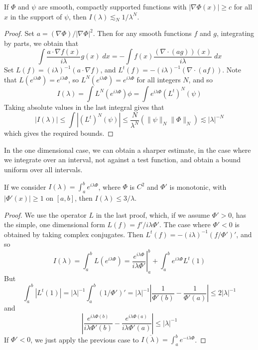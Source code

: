 \begin{theorem}
	If $\Phi$ and $\psi$ are smooth, compactly supported functions with $|\nabla \Phi(x)| \geq c$ for all $x$ in the support of $\psi$, then $I(\lambda) \lesssim_N 1/\lambda^N$.
\end{theorem}
\begin{proof}
	Set $a = (\nabla \Phi)/|\nabla \Phi|^2$. Then for any smooth functions $f$ and $g$, integrating by parts, we obtain that
	\[ \int \frac{a \cdot \nabla f(x)}{i \lambda} g(x)\; dx = - \int f(x) \frac{(\nabla \cdot (ag))(x)}{i \lambda}\; dx \]
	Set $L(f) = (i \lambda)^{-1} (a \cdot \nabla f)$, and $L^t(f) = - (i\lambda)^{-1} (\nabla \cdot (af))$. Note that $L(e^{i \lambda \Phi}) = e^{i \lambda \Phi}$, so $L^N(e^{i \lambda \Phi}) = e^{i \lambda \Phi}$ for all integers $N$, and so
	\[ I(\lambda) = \int L^N(e^{i \lambda \Phi}) \phi = \int e^{i \lambda \Phi} (L^t)^N(\psi) \]
	Taking absolute values in the last integral gives that
	\[ |I(\lambda)| \leq \int |(L^t)^N(\psi)| \leq \frac{N}{\lambda^N} (\| \psi \|_N \| \Phi \|_N) \lesssim |\lambda|^{-N} \]
	which gives the required bounds.
\end{proof}

In the one dimensional case, we can obtain a sharper estimate, in the case where we integrate over an interval, not against a test function, and obtain a bound uniform over all intervals.

\begin{theorem}
	If we consider $I(\lambda) = \int_a^b e^{i \lambda \Phi}$, where $\Phi$ is $C^2$ and $\Phi'$ is monotonic, with $|\Phi'(x)| \geq 1$ on $[a,b]$, then $I(\lambda) \leq 3/\lambda$.
\end{theorem}
\begin{proof}
	We use the operator $L$ in the last proof, which, if we assume $\Phi' > 0$, has the simple, one dimensional form $L(f) = f'/i \lambda \Phi'$. The case where $\Phi' < 0$ is obtained by taking complex conjugates. Then $L^t(f) = - (i\lambda)^{-1} (f/\Phi')'$, and so
	\[ I(\lambda) = \int_a^b L(e^{i \lambda \Phi}) = \left. \frac{e^{i \lambda \Phi}}{i \lambda \Phi'} \right|_a^b + \int_a^b e^{i \lambda \Phi} L^t(1) \]
	But
	\[ \int_a^b |L^t(1)| = |\lambda|^{-1} \int_a^b (1/\Phi')' = |\lambda|^{-1} \left| \frac{1}{\Phi'(b)} - \frac{1}{\Phi'(a)} \right| \leq 2 |\lambda|^{-1} \]
	and
	\[ \left| \frac{e^{i \lambda \Phi(b)}}{i \lambda \Phi'(b)} - \frac{e^{i \lambda \Phi(a)}}{i \lambda \Phi'(a)} \right| \leq |\lambda|^{-1} \]
	If $\Phi' < 0$, we just apply the previous case to $\overline{I(\lambda)} = \int_a^b e^{- i \lambda \Phi}$.
\end{proof}

